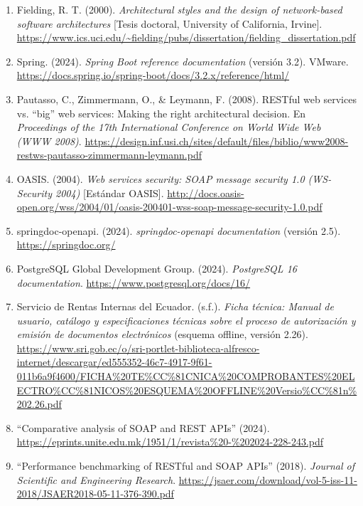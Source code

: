 \documentclass[11pt,a4paper]{article}
\begin{document}
\begin{enumerate}[leftmargin=*, itemsep=6pt]

\item Fielding, R. T. (2000). \emph{Architectural styles and the design of
network-based software architectures} [Tesis doctoral, University of
California, Irvine]. \url{https://www.ics.uci.edu/~fielding/pubs/dissertation/fielding_dissertation.pdf}

\item Spring. (2024). \emph{Spring Boot reference documentation} (versión
3.2). VMware. \url{https://docs.spring.io/spring-boot/docs/3.2.x/reference/html/}

\item Pautasso, C., Zimmermann, O., \& Leymann, F. (2008). RESTful web
services vs. ``big'' web services: Making the right architectural
decision. En \emph{Proceedings of the 17th International Conference on
World Wide Web (WWW 2008)}.
\url{https://design.inf.usi.ch/sites/default/files/biblio/www2008-restws-pautasso-zimmermann-leymann.pdf}

\item OASIS. (2004). \emph{Web services security: SOAP message security
1.0 (WS-Security 2004)} [Estándar OASIS].
\url{http://docs.oasis-open.org/wss/2004/01/oasis-200401-wss-soap-message-security-1.0.pdf}

\item springdoc-openapi. (2024). \emph{springdoc-openapi documentation}
(versión 2.5). \url{https://springdoc.org/}

\item PostgreSQL Global Development Group. (2024). \emph{PostgreSQL 16
documentation}. \url{https://www.postgresql.org/docs/16/}

\item Servicio de Rentas Internas del Ecuador. (s.f.). \emph{Ficha
técnica: Manual de usuario, catálogo y especificaciones técnicas sobre el
proceso de autorización y emisión de documentos electrónicos} (esquema
offline, versión 2.26).
\url{https://www.sri.gob.ec/o/sri-portlet-biblioteca-alfresco-internet/descargar/ed555352-46c7-4917-9f61-011b6a9f4600/FICHA\%20TE\%CC\%81CNICA\%20COMPROBANTES\%20ELECTRO\%CC\%81NICOS\%20ESQUEMA\%20OFFLINE\%20Versio\%CC\%81n\%202.26.pdf}

\item ``Comparative analysis of SOAP and REST APIs'' (2024).
\url{https://eprints.unite.edu.mk/1951/1/revista\%20-\%202024-228-243.pdf}

\item ``Performance benchmarking of RESTful and SOAP APIs'' (2018).
\emph{Journal of Scientific and Engineering Research}.
\url{https://jsaer.com/download/vol-5-iss-11-2018/JSAER2018-05-11-376-390.pdf}


\end{enumerate}
\end{document}
